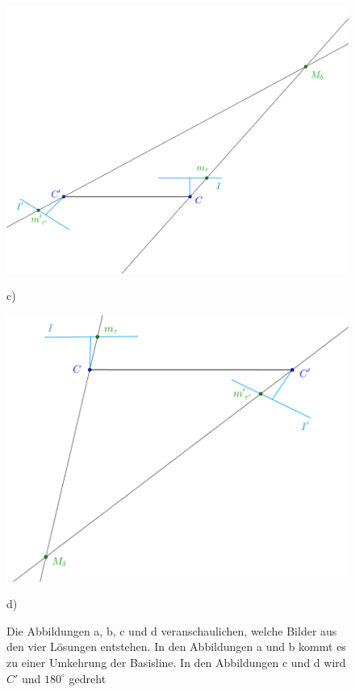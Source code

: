 \begin{figure}[!htb]
	\includegraphics[width=\linewidth]{images/P_Solution_three.png}
	\caption{c)}
	\label{fig:T_3}
	\endminipage\hfill
	\includegraphics[width=\linewidth]{images/P_Solution_four.png}
	\caption{d)}
	\label{fig:T_4}
	\endminipage\hfill
	\caption{Die Abbildungen a, b, c und d veranschaulichen, welche Bilder aus den vier Lösungen entstehen. In den Abbildungen a und b kommt es zu einer Umkehrung der Basisline. In den Abbildungen c und d wird $C'$ und $180^\circ$ gedreht}
\end{figure}
\pagebreak



